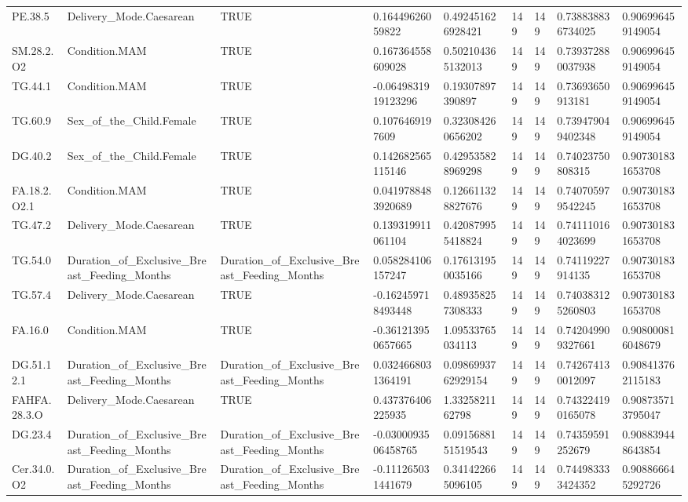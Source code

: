\begin{longtable}{lllllllll}
PE.38.5 & Delivery\_Mode.Caesarean & TRUE & 0.16449626059822 & 0.492451626928421 & 149 & 149 & 0.738838836734025 & 0.906996459149054 \\
SM.28.2.O2 & Condition.MAM & TRUE & 0.167364558609028 & 0.502104365132013 & 149 & 149 & 0.739372880037938 & 0.906996459149054 \\
TG.44.1 & Condition.MAM & TRUE & -0.0649831919123296 & 0.19307897390897 & 149 & 149 & 0.73693650913181 & 0.906996459149054 \\
TG.60.9 & Sex\_of\_the\_Child.Female & TRUE & 0.1076469197609 & 0.323084260656202 & 149 & 149 & 0.739479049402348 & 0.906996459149054 \\
DG.40.2 & Sex\_of\_the\_Child.Female & TRUE & 0.142682565115146 & 0.429535828969298 & 149 & 149 & 0.74023750808315 & 0.907301831653708 \\
FA.18.2.O2.1 & Condition.MAM & TRUE & 0.0419788483920689 & 0.126611328827676 & 149 & 149 & 0.740705979542245 & 0.907301831653708 \\
TG.47.2 & Delivery\_Mode.Caesarean & TRUE & 0.139319911061104 & 0.420879955418824 & 149 & 149 & 0.741110164023699 & 0.907301831653708 \\
TG.54.0 & Duration\_of\_Exclusive\_Breast\_Feeding\_Months & Duration\_of\_Exclusive\_Breast\_Feeding\_Months & 0.058284106157247 & 0.176131950035166 & 149 & 149 & 0.74119227914135 & 0.907301831653708 \\
TG.57.4 & Delivery\_Mode.Caesarean & TRUE & -0.162459718493448 & 0.489358257308333 & 149 & 149 & 0.740383125260803 & 0.907301831653708 \\
FA.16.0 & Condition.MAM & TRUE & -0.361213950657665 & 1.09533765034113 & 149 & 149 & 0.742049909327661 & 0.908000816048679 \\
DG.51.12.1 & Duration\_of\_Exclusive\_Breast\_Feeding\_Months & Duration\_of\_Exclusive\_Breast\_Feeding\_Months & 0.0324668031364191 & 0.0986993762929154 & 149 & 149 & 0.742674130012097 & 0.908413762115183 \\
FAHFA.28.3.O & Delivery\_Mode.Caesarean & TRUE & 0.437376406225935 & 1.3325821162798 & 149 & 149 & 0.743224190165078 & 0.908735713795047 \\
DG.23.4 & Duration\_of\_Exclusive\_Breast\_Feeding\_Months & Duration\_of\_Exclusive\_Breast\_Feeding\_Months & -0.0300093506458765 & 0.0915688151519543 & 149 & 149 & 0.74359591252679 & 0.908839448643854 \\
Cer.34.0.O2 & Duration\_of\_Exclusive\_Breast\_Feeding\_Months & Duration\_of\_Exclusive\_Breast\_Feeding\_Months & -0.111265031441679 & 0.341422665096105 & 149 & 149 & 0.744983333424352 & 0.908866645292726 \\

\end{longtable}
